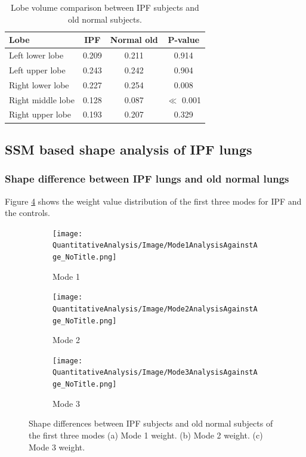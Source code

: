\begin{table}[htbp]
\centering
\caption{Lobe volume comparison between IPF subjects and old normal subjects.}
\label{tab:LobeVolumeComparison}
\begin{tabular}{| l | c | c | c |}
\hline
\bf{Lobe} & \bf{IPF} & \bf{Normal old} & \bf{P-value}\\
\hline
Left lower lobe & 0.209 & 0.211 & 0.914\\
\hline
Left upper lobe	& 0.243 & 0.242 & 0.904\\
\hline
Right lower lobe	& 0.227 & 0.254 & 0.008\\
\hline
Right middle lobe	& 0.128 & 0.087 & $\ll$ 0.001\\
\hline
Right upper lobe	& 0.193 & 0.207 & 0.329\\
\hline
\end{tabular}
\end{table}

\subsection{SSM based shape analysis of IPF lungs}
\subsubsection{Shape difference between IPF lungs and old normal lungs}
Figure \ref{fig:ShapeDifference} shows the weight value distribution of the first three modes for IPF and the controls. 

\begin{figure}[htbp] 
\centering
\begin{subfigure}{.65\linewidth}%
  \texttt{[image: QuantitativeAnalysis/Image/Mode1AnalysisAgainstAge\_NoTitle.png]} %
  \caption{Mode 1}
  \label{fig:ShapeDifference-a} 
\end{subfigure} 
\begin{subfigure}{.65\linewidth}%
  \texttt{[image: QuantitativeAnalysis/Image/Mode2AnalysisAgainstAge\_NoTitle.png]}
  \caption{Mode 2}
  \label{fig:ShapeDifference-b}
\end{subfigure}
\begin{subfigure}{.65\linewidth}%
  \texttt{[image: QuantitativeAnalysis/Image/Mode3AnalysisAgainstAge\_NoTitle.png]}
  \caption{Mode 3}
  \label{fig:ShapeDifference-c}
\end{subfigure}
\caption{ Shape differences between IPF subjects and old normal subjects of the first three modes (a) Mode 1 weight. (b) Mode 2 weight. (c) Mode 3  weight.}
\label{fig:ShapeDifference}
\end{figure}

